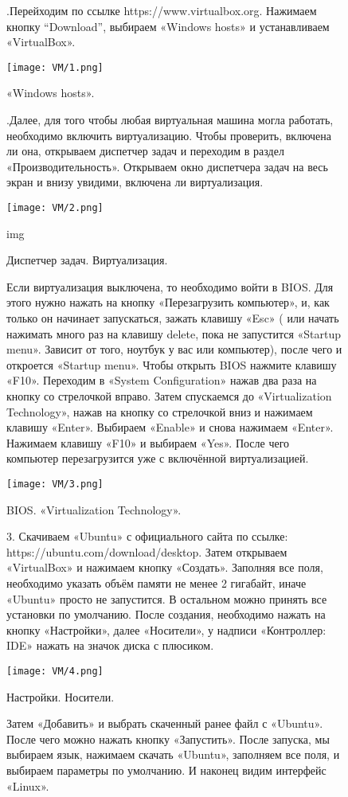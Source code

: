\begin{figure}
.\quad Перейходим по ссылке https://www.virtualbox.org. Нажимаем кнопку “Download”, выбираем «Windows hosts» и устанавливаем «VirtualBox». 
		
		\centering
		\texttt{[image: VM/1.png]}
\caption{«Windows hosts».}
\label{ris:image}
\end{figure}

\begin{figure}
.\quad Далее, для того чтобы любая виртуальная машина могла работать, необходимо включить виртуализацию. Чтобы проверить, включена ли она, открываем диспетчер задач и переходим в раздел «Производительность». Открываем окно диспетчера задач на весь экран и внизу увидими, включена ли виртуализация.

		\centering
		\texttt{[image: VM/2.png]}
\caption{Диспетчер задач. Виртуализация.}
\label{ris:image}img
\end{figure}

\begin{figure}
\quad Если виртуализация выключена, то необходимо войти в BIOS. Для этого нужно нажать на кнопку «Перезагрузить компьютер», и, как только он начинает запускаться, зажать клавишу «Esc» ( или начать нажимать много раз на клавишу delete, пока не запустится «Startup menu». Зависит от того, ноутбук у вас или компьютер), после чего и откроется «Startup menu». Чтобы открыть BIOS нажмите клавишу «F10». Переходим в «System Configuration» нажав два раза на кнопку со стрелочкой вправо. Затем спускаемся до «Virtualization Technology», нажав на кнопку со стрелочкой вниз и нажимаем клавишу «Enter». Выбираем «Enable» и снова нажимаем «Enter». Нажимаем клавишу «F10» и выбираем «Yes». После чего компьютер перезагрузится уже с включённой виртуализацией.

		\centering
		\texttt{[image: VM/3.png]}
\caption{BIOS. «Virtualization Technology».}
\label{ris:image}
\end{figure}

\begin{figure}
3. Скачиваем «Ubuntu» с официального сайта по ссылке: https://ubuntu.com/download/desktop. Затем открываем «VirtualBox» и нажимаем кнопку «Создать». Заполняя все поля, необходимо указать объём памяти не менее 2 гигабайт, иначе «Ubuntu» просто не запустится. В остальном можно принять все установки по умолчанию. После создания, необходимо нажать на кнопку «Настройки», далее «Носители», у надписи «Контроллер: IDE» нажать на значок диска с плюсиком. 

		\centering
		\texttt{[image: VM/4.png]}
\caption{Настройки. Носители.}
\label{ris:image}

\end{figure}

\begin{figure}
\quad Затем «Добавить» и выбрать скаченный ранее файл с «Ubuntu». После чего можно нажать кнопку «Запустить». После запуска, мы выбираем язык, нажимаем скачать «Ubuntu», заполняем все поля, и выбираем параметры по умолчанию. И наконец видим интерфейс «Linux».
\end{figure}
